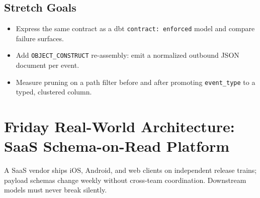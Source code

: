 \subsection*{Stretch Goals}
\begin{itemize}
    \item Express the same contract as a dbt \texttt{contract: enforced} model and compare failure surfaces.
    \item Add \texttt{OBJECT\_CONSTRUCT} re-assembly: emit a normalized outbound JSON document per event.
    \item Measure pruning on a path filter before and after promoting \texttt{event\_type} to a typed, clustered column.
\end{itemize}

\section{Friday Real-World Architecture: SaaS Schema-on-Read Platform}
A SaaS vendor ships iOS, Android, and web clients on independent release trains; payload schemas change weekly without cross-team coordination. Downstream models must never break silently.


